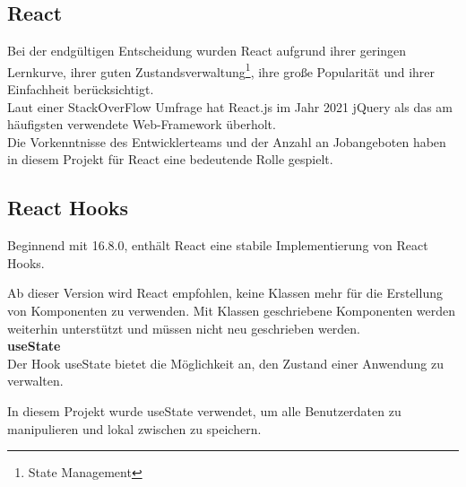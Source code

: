 \subsection{React}
Bei der endgültigen Entscheidung wurden React aufgrund ihrer geringen Lernkurve, ihrer guten Zustandsverwaltung\footnote{State Management}, ihre große Popularität und ihrer Einfachheit berücksichtigt.
\\
Laut einer StackOverFlow Umfrage hat React.js im Jahr 2021 jQuery als das am häufigsten verwendete Web-Framework überholt. {\cite{SO01}}
\\
Die Vorkenntnisse des Entwicklerteams und der Anzahl an Jobangeboten haben in diesem Projekt für React eine bedeutende Rolle gespielt.

\subsection{React Hooks}
Beginnend mit 16.8.0, enthält React eine stabile Implementierung von React Hooks.

Ab dieser Version wird React empfohlen, keine Klassen mehr für die Erstellung von Komponenten zu verwenden.
Mit Klassen geschriebene Komponenten werden weiterhin unterstützt und müssen nicht neu geschrieben werden.
  {\cite{R05}}
\\

\textbf{useState}
\\
Der Hook useState bietet die Möglichkeit an, den Zustand einer Anwendung zu verwalten. 

In diesem Projekt wurde useState verwendet, um alle Benutzerdaten zu manipulieren und lokal zwischen zu speichern.

